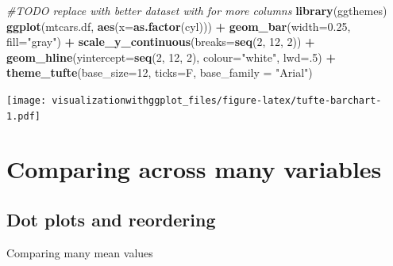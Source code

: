 \documentclass[]{krantz}
\makeatletter
\newenvironment{Shaded}{\begin{snugshade}}{\end{snugshade}}
\newcommand{\CommentTok}[1]{\textcolor[rgb]{0.56,0.35,0.01}{\textit{#1}}}
\newcommand{\DataTypeTok}[1]{\textcolor[rgb]{0.13,0.29,0.53}{#1}}
\newcommand{\DecValTok}[1]{\textcolor[rgb]{0.00,0.00,0.81}{#1}}
\newcommand{\FloatTok}[1]{\textcolor[rgb]{0.00,0.00,0.81}{#1}}
\newcommand{\KeywordTok}[1]{\textcolor[rgb]{0.13,0.29,0.53}{\textbf{#1}}}
\newcommand{\NormalTok}[1]{#1}
\newcommand{\OperatorTok}[1]{\textcolor[rgb]{0.81,0.36,0.00}{\textbf{#1}}}
\newcommand{\StringTok}[1]{\textcolor[rgb]{0.31,0.60,0.02}{#1}}
\newenvironment{kframe}{%
\medskip{}
\setlength{\fboxsep}{.8em}
 \def\at@end@of@kframe{}%
 \ifinner\ifhmode%
  \def\at@end@of@kframe{\end{minipage}}%
  \begin{minipage}{\columnwidth}%
 \fi\fi%
 \def\FrameCommand##1{\hskip\@totalleftmargin \hskip-\fboxsep
 \colorbox{shadecolor}{##1}\hskip-\fboxsep
     \hskip-\linewidth \hskip-\@totalleftmargin \hskip\columnwidth}%
 \MakeFramed {\advance\hsize-\width
   \@totalleftmargin\z@ \linewidth\hsize
   \@setminipage}}%
 {\par\unskip\endMakeFramed%
 \at@end@of@kframe}
\renewenvironment{Shaded}{\begin{kframe}}{\end{kframe}}
\makeatother
\begin{document}
\begin{Shaded}
\begin{Highlighting}[]
\CommentTok{#TODO replace with better dataset with for more columns}
\KeywordTok{library}\NormalTok{(ggthemes)}
\KeywordTok{ggplot}\NormalTok{(mtcars.df, }\KeywordTok{aes}\NormalTok{(}\DataTypeTok{x=}\KeywordTok{as.factor}\NormalTok{(cyl))) }\OperatorTok{+}\StringTok{ }
\StringTok{  }\KeywordTok{geom_bar}\NormalTok{(}\DataTypeTok{width=}\FloatTok{0.25}\NormalTok{, }\DataTypeTok{fill=}\StringTok{"gray"}\NormalTok{) }\OperatorTok{+}\StringTok{  }
\StringTok{  }\KeywordTok{scale_y_continuous}\NormalTok{(}\DataTypeTok{breaks=}\KeywordTok{seq}\NormalTok{(}\DecValTok{2}\NormalTok{, }\DecValTok{12}\NormalTok{, }\DecValTok{2}\NormalTok{)) }\OperatorTok{+}\StringTok{ }
\StringTok{  }\KeywordTok{geom_hline}\NormalTok{(}\DataTypeTok{yintercept=}\KeywordTok{seq}\NormalTok{(}\DecValTok{2}\NormalTok{, }\DecValTok{12}\NormalTok{, }\DecValTok{2}\NormalTok{), }\DataTypeTok{colour=}\StringTok{"white"}\NormalTok{, }\DataTypeTok{lwd=}\NormalTok{.}\DecValTok{5}\NormalTok{) }\OperatorTok{+}
\StringTok{  }\KeywordTok{theme_tufte}\NormalTok{(}\DataTypeTok{base_size=}\DecValTok{12}\NormalTok{, }\DataTypeTok{ticks=}\NormalTok{F, }\DataTypeTok{base_family =} \StringTok{"Arial"}\NormalTok{) }
\end{Highlighting}
\end{Shaded}

\texttt{[image: visualizationwithggplot\_files/figure-latex/tufte-barchart-1.pdf]}

\hypertarget{comparing-across-many-variables}{%
\section{Comparing across many variables}\label{comparing-across-many-variables}}

\hypertarget{dot-plots-and-reordering}{%
\subsection{Dot plots and reordering}\label{dot-plots-and-reordering}}

Comparing many mean values
\end{document}
